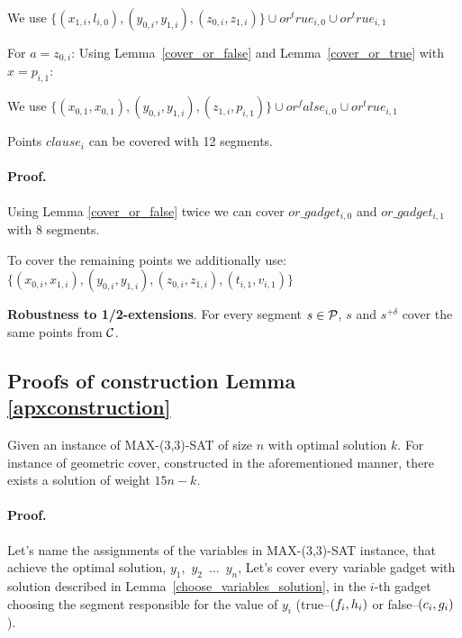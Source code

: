 We use 
$\{ (x_{1, i}, l_{i, 0}), (y_{0, i}, y_{1, i}),
(z_{0, i}, z_{1, i}) \} \cup or^true_{i, 0} \cup or^true_{i, 1}$

For $a = z_{0, i}$:
Using Lemma~\ref{cover_or_false} and Lemma~\ref{cover_or_true} with $x = p_{i, 1}$:

We use 
$\{ (x_{0, 1}, x_{0, 1}), (y_{0, i}, y_{1, i}),
(z_{1, i}, p_{i, 1}) \} \cup or^false_{i, 0} \cup or^true_{i, 1}$


\begin{lemma}
 Points $clause_i$ can be covered with 12 segments.
\end{lemma}

\paragraph{Proof.}
Using Lemma \ref{cover_or_false} twice we can
cover $or\_gadget_{i,0}$ and  $or\_gadget_{i,1}$
with 8 segments.

To cover the remaining points we additionally use:
$\{ (x_{0, i}, x_{1, i}), (y_{0, i}, y_{1, i}),
(z_{0, i}, z_{1, i}), (t_{i, 1}, v_{i, 1}) \}$

\begin{lemma}
\textbf{Robustness to 1/2-extensions}. For every segment $s \in \mathcal{P}$,
$s$ and $s^{+\delta}$ cover the same points from $\mathcal{C}$.
\end{lemma}

\subsection{Proofs of construction Lemma \ref{apxconstruction}}
\begin{lemma}
	\label{construction_correctness}
	Given an instance of MAX-(3,3)-SAT of size $n$
	with optimal solution $k$.
	For instance of geometric cover, constructed
	in the aforementioned manner, 
	there exists a solution of weight $15n - k$.
\end{lemma}
\paragraph{Proof.}
Let's name the assignments of the variables in MAX-(3,3)-SAT instance,
that achieve the optimal solution,
$y_1$,~$y_2$~$\ldots$~$y_n$,
Let's cover every variable gadget with solution described in
Lemma~\ref{choose_variables_solution},
in the $i$-th gadget choosing the segment responsible for the
value of $y_i$
(true--$(f_i, h_i)$ or false--$(c_i, g_i)$).

